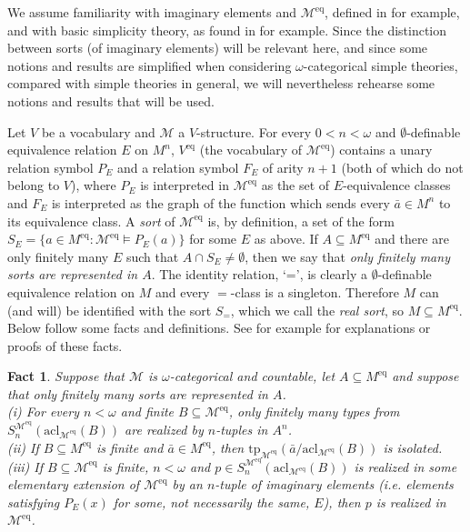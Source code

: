 \documentclass[11pt, twoside]{amsart}
\newtheorem{fact}[theor]{Fact}
\numberwithin{equation}{section}
\newcommand{\tp}{\mathrm{tp}}
\newcommand{\acl}{\mathrm{acl}}
\newcommand{\es}{\emptyset}
\newcommand{\meq}{^{\mathrm{eq}}}
\newcommand{\mcM}{\mathcal{M}}
\begin{document}
\noindent
We assume familiarity with imaginary elements and $\mcM\meq$, defined in \cite{Hod, She} for example,
and with basic simplicity theory, as found in \cite{Cas, Wag} for example.
Since the distinction between sorts (of imaginary elements) will be relevant here, and since 
some notions and results are simplified when considering $\omega$-categorical simple theories, 
compared with simple theories in general, we will nevertheless rehearse some notions and results that will be used.

Let $V$ be a vocabulary and $\mcM$ a $V$-structure.
For every $0 < n < \omega$ and $\es$-definable equivalence relation $E$ on $M^n$,
$V\meq$ (the vocabulary of $\mcM\meq$) contains a unary relation symbol $P_E$ and 
a relation symbol $F_E$ of arity $n+1$ (both of which do not belong to $V$), where $P_E$ is
interpreted in $\mcM\meq$ as the set of $E$-equivalence classes and
$F_E$ is interpreted as the graph of the function which sends every $\bar{a} \in  M^n$
to its equivalence class.
A {\em sort} of $\mcM\meq$ is, by definition, a set of the form $S_E = \{a \in M\meq : \mcM\meq \models P_E(a) \}$ for some 
$E$ as above. If $A \subseteq M\meq$ and there are only finitely many $E$ such that $A \cap S_E \neq \es$, 
then we say that {\em only finitely many sorts are represented in $A$}.
The identity relation, `=', is clearly a $\es$-definable equivalence relation on $M$ and every $=$-class is a singleton.
Therefore $M$ can (and will) be identified with the sort $S_=$, which we call the {\em real sort}, so $M \subseteq M\meq$.
Below follow some facts and definitions. See for example \cite{AK14} for explanations or proofs of these facts.

\begin{fact}\label{facts about simple omega-categorical structures}
Suppose that $\mcM$ is $\omega$-categorical and countable, 
let  $A \subseteq M\meq$ and suppose that only finitely many sorts are represented in $A$. \\
(i) For every $n < \omega$ and finite $B \subseteq \mcM\meq$, only finitely many types from $S_n^{\mcM\meq}(\acl_{\mcM\meq}(B))$
are realized by $n$-tuples in $A^n$.\\
(ii) If $B \subseteq M\meq$ is finite and $\bar{a} \in M\meq$,
then $\tp_{\mcM\meq}(\bar{a} / \acl_{\mcM\meq}(B))$ is isolated. \\
(iii) If $B \subseteq \mcM\meq$ is finite, $n < \omega$ and $p \in S_n^{\mcM\meq}(\acl_{\mcM\meq}(B))$ is realized 
in some elementary extension of $\mcM\meq$ by an $n$-tuple of imaginary elements
(i.e. elements satisfying $P_E(x)$ for some, not necessarily the same, $E$),
then $p$ is realized in $\mcM\meq$.
\end{fact}
\end{document}
